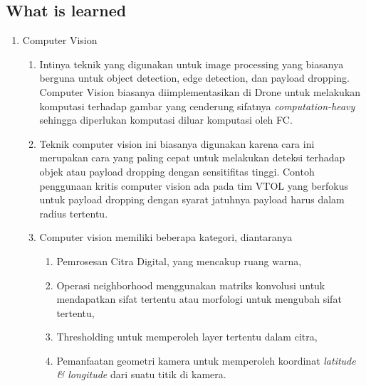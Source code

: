 \documentclass{article}
\begin{document}
\subsection{What is learned}
\begin{enumerate}
    \item Computer Vision
    \begin{enumerate}
        \item Intinya teknik yang digunakan untuk image processing yang biasanya berguna untuk object detection, edge detection, dan payload dropping. Computer Vision biasanya diimplementasikan di Drone untuk melakukan komputasi terhadap gambar yang cenderung sifatnya \textit{computation-heavy} sehingga diperlukan komputasi diluar komputasi oleh FC. 
        \item Teknik computer vision ini biasanya digunakan karena cara ini merupakan cara yang paling cepat untuk melakukan deteksi terhadap objek atau payload dropping dengan sensitifitas tinggi. Contoh penggunaan kritis computer vision ada pada tim VTOL yang berfokus untuk payload dropping dengan syarat jatuhnya payload harus dalam radius tertentu.
        \item Computer vision memiliki beberapa kategori, diantaranya
        \begin{enumerate}
            \item Pemrosesan Citra Digital, yang mencakup ruang warna,
            \item Operasi neighborhood menggunakan matriks konvolusi untuk mendapatkan sifat tertentu atau morfologi untuk mengubah sifat tertentu, 
            \item Thresholding untuk memperoleh layer tertentu dalam citra, 
            \item Pemanfaatan geometri kamera untuk memperoleh koordinat \textit{latitude \& longitude} dari suatu titik di kamera.
        \end{enumerate}
    \end{enumerate}


\end{enumerate}
\end{document}
